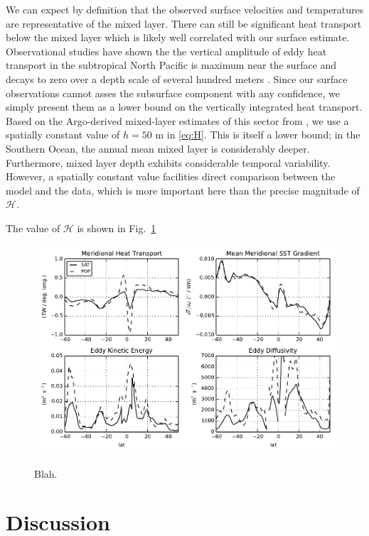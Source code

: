 \documentclass[10pt]{article}
\begin{document}
We can expect by definition that the observed surface velocities and temperatures are representative of the mixed layer. There can still be significant heat transport below the mixed layer which is likely well correlated with our surface estimate. Observational studies have shown the the vertical amplitude of eddy heat transport in the subtropical North Pacific is maximum near the surface and decays to zero over a depth scale of several hundred meters \citep{RoemmichGilson2001,QiuChen2005}. Since our surface observations cannot asses the subsurface component with any confidence, we simply present them as a lower bound on the vertically integrated heat transport. Based on the Argo-derived mixed-layer estimates of this sector from \citet{HolteTalley2009}, we use a spatially constant value of $h = 50$ m in \eqref{eq:H}. This is itself a lower bound; in the Southern Ocean, the annual mean mixed layer is considerably deeper. Furthermore, mixed layer depth exhibits considerable temporal variability. However, a spatially constant value facilities direct comparison between the model and the data, which is more important here than the precise magnitude of $\mathcal{H}$.

The value of $\mathcal{H}$ is shown in Fig.~\ref{fig:H}

\begin{figure}[t!]
  \noindent \includegraphics{../figures/MHT_gradient_EKE_diffusivity.pdf}\\
  \caption{Blah.}
  \label{fig:H}
\end{figure}


\section{Discussion}
\end{document}
